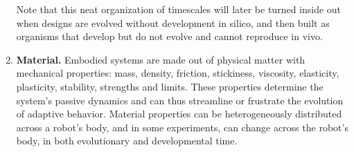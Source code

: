\begin{enumerate}
    Note that this neat organization of timescales will
    later be turned inside out when designs are evolved without development in silico, and then built as organisms that develop but do not evolve and cannot reproduce in vivo.
    
    \item \textbf{Material.} Embodied systems are made out of physical matter
    with mechanical properties: 
    mass, density, friction,
    stickiness,
    viscosity,
    elasticity, plasticity,
    stability,
    strengths and limits.
    These 
    properties determine the system's passive dynamics and can thus streamline or frustrate the evolution of adaptive behavior.
    Material properties can be heterogeneously distributed across a robot's body, and in some experiments, 
    can change across the robot's body, in both evolutionary and developmental time.
    

\end{enumerate}
